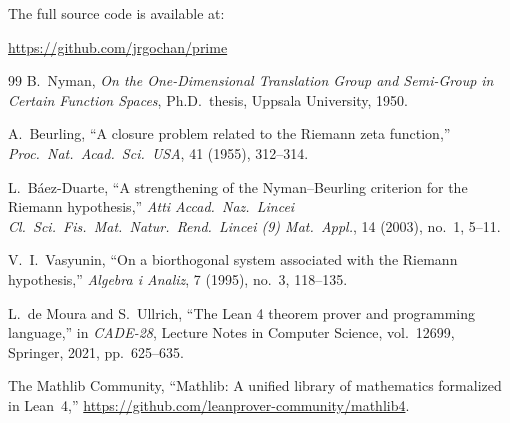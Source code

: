 \documentclass[11pt,a4paper]{article}
\theoremstyle{definition}
\begin{document}
The full source code is available at:
\begin{center}
\url{https://github.com/jrgochan/prime}
\end{center}


\begin{thebibliography}{99}
B.~Nyman, \emph{On the One-Dimensional Translation Group and Semi-Group
in Certain Function Spaces}, Ph.D.\ thesis, Uppsala University, 1950.

A.~Beurling, ``A closure problem related to the Riemann zeta function,''
\emph{Proc.\ Nat.\ Acad.\ Sci.\ USA}, 41 (1955), 312--314.

L.~B\'aez-Duarte, ``A strengthening of the Nyman--Beurling criterion
for the Riemann hypothesis,'' \emph{Atti Accad.\ Naz.\ Lincei Cl.\ Sci.\
Fis.\ Mat.\ Natur.\ Rend.\ Lincei (9) Mat.\ Appl.}, 14 (2003), no.~1, 5--11.

V.~I.~Vasyunin, ``On a biorthogonal system associated with the Riemann
hypothesis,'' \emph{Algebra i Analiz}, 7 (1995), no.~3, 118--135.

L.~de Moura and S.~Ullrich, ``The Lean 4 theorem prover and programming
language,'' in \emph{CADE-28}, Lecture Notes in Computer Science, vol.\
12699, Springer, 2021, pp.~625--635.

The Mathlib Community, ``Mathlib: A unified library of mathematics
formalized in Lean~4,'' \url{https://github.com/leanprover-community/mathlib4}.
\end{thebibliography}
\end{document}
